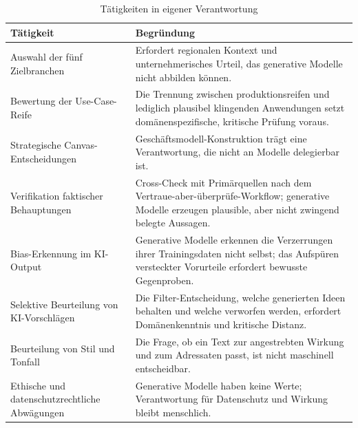 \documentclass[a4paper,11pt]{article}
\begin{document}
\begin{table}[H]
\centering
\caption{Tätigkeiten in eigener Verantwortung}
\label{tab:strategie_mensch}
\begin{tabular}{p{6cm}p{9cm}}
\toprule
\textbf{Tätigkeit} & \textbf{Begründung} \\
\midrule
Auswahl der fünf Zielbranchen & Erfordert regionalen Kontext und unternehmerisches Urteil, das generative Modelle nicht abbilden können. \\
Bewertung der Use-Case-Reife & Die Trennung zwischen produktionsreifen und lediglich plausibel klingenden Anwendungen setzt domänenspezifische, kritische Prüfung voraus. \\
Strategische Canvas-Entscheidungen & Geschäftsmodell-Konstruktion trägt eine Verantwortung, die nicht an Modelle delegierbar ist. \\
Verifikation faktischer Behauptungen & Cross-Check mit Primärquellen nach dem Vertraue-aber-überprüfe-Workflow; generative Modelle erzeugen plausible, aber nicht zwingend belegte Aussagen. \\
Bias-Erkennung im KI-Output & Generative Modelle erkennen die Verzerrungen ihrer Trainingsdaten nicht selbst; das Aufspüren versteckter Vorurteile erfordert bewusste Gegenproben. \\
Selektive Beurteilung von KI-Vorschlägen & Die Filter-Entscheidung, welche generierten Ideen behalten und welche verworfen werden, erfordert Domänenkenntnis und kritische Distanz. \\
Beurteilung von Stil und Tonfall & Die Frage, ob ein Text zur angestrebten Wirkung und zum Adressaten passt, ist nicht maschinell entscheidbar. \\
Ethische und datenschutzrechtliche Abwägungen & Generative Modelle haben keine Werte; Verantwortung für Datenschutz und Wirkung bleibt menschlich. \\
\bottomrule
\end{tabular}
\end{table}
\end{document}
